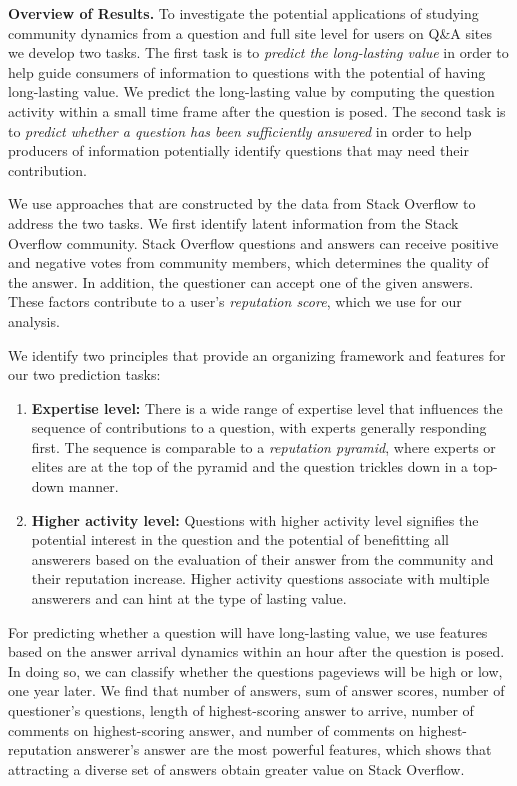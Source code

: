\noindent\textbf{Overview of Results.} To investigate the potential applications of studying community dynamics from a question and full site level for users on Q\&A sites we develop two tasks. The first task is to \textit{predict the long-lasting value} in order to help guide consumers of information to questions with the potential of having long-lasting value. We predict the long-lasting value by computing the question activity within a small time frame after the question is posed. The second task is to \textit{predict whether a question has been sufficiently answered} in order to help producers of information potentially identify questions that may need their contribution. 


We use approaches that are constructed by the data from Stack Overflow to address the two tasks. We first identify latent information from the Stack Overflow community. Stack Overflow questions and answers can receive positive and negative votes from community members, which determines the quality of the answer. In addition, the questioner can accept one of the given answers. These factors contribute to a user's \textit{reputation score}, which we use for our analysis.


We identify two principles that provide an organizing framework and features for our two prediction tasks:

	\begin{enumerate}
		\item \textbf{Expertise level: } There is a wide range of expertise level that  influences the sequence of contributions to a question, with experts generally responding first. The sequence is comparable to a \textit{reputation pyramid}, where experts or elites are at the top of the pyramid and the question trickles down in a top-down manner.
		\item \textbf{Higher activity level: } Questions with higher activity level signifies the potential interest in the question and the potential of benefitting all answerers based on the evaluation of their answer from the community and their reputation increase. Higher activity questions associate with multiple answerers and can hint at the type of lasting value.
	\end{enumerate}

For predicting whether a question will have long-lasting value, we use features based on the answer arrival dynamics within an hour after the question is posed. In doing so, we can classify whether the questions pageviews will be high or low, one year later. We find that number of answers, sum of answer scores, number of questioner's questions, length of highest-scoring answer to arrive, number of comments on highest-scoring answer, and number of comments on highest-reputation answerer's answer are the most powerful features, which shows that attracting a diverse set of answers obtain greater value on Stack Overflow.


